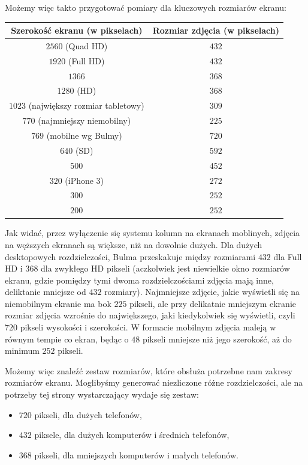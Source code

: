 \documentclass[licencjacka]{pracadypl}
\begin{document}
Możemy więc takto przygotować pomiary dla kluczowych rozmiarów ekranu:

\begin{center}
  \begin{tabular}{|c|c|}
    \hline
    Szerokość ekranu (w pikselach) & Rozmiar zdjęcia (w pikselach) \\
    \hline
    $2560$ (Quad HD) & $432$ \\
    $1920$ (Full HD) & $432$ \\
    $1366$ & $368$ \\
    $1280$ (HD) & $368$ \\
    $1023$ (największy rozmiar tabletowy) & $309$ \\
    $770$ (najmniejszy niemobilny) & $225$ \\
    $769$ (mobilne wg Bulmy) & $720$ \\
    $640$ (SD) & $592$ \\
    $500$ & $452$ \\
    $320$ (iPhone 3) & $272$ \\
    $300$ & $252$ \\
    $200$ & $252$ \\
    \hline
  \end{tabular}
\end{center}

Jak widać, przez wyłączenie się systemu kolumn na ekranach moblinych, zdjęcia na węższych ekranach są większe, niż na dowolnie dużych. Dla dużych desktopowych rozdzielczości, Bulma przeskakuje między rozmiarami $432$ dla Full HD i $368$ dla zwykłego HD pikseli (aczkolwiek jest niewielkie okno rozmiarów ekranu, gdzie pomiędzy tymi dwoma rozdzielczościami zdjęcia mają inne, deliktanie mniejsze od $432$ rozmiary). Najmniejsze zdjęcie, jakie wyświetli się na niemobilnym ekranie ma bok $225$ pikseli, ale przy delikatnie mniejszym ekranie rozmiar zdjęcia wzrośnie do największego, jaki kiedykolwiek się wyświetli, czyli $720$ pikseli wysokości i szerokości. W formacie mobilnym zdjęcia maleją w równym tempie co ekran, będąc o $48$ pikseli mniejsze niż jego szerokość, aż do minimum $252$ pikseli.

Możemy więc znaleźć zestaw rozmiarów, które obsłuża potrzebne nam zakresy rozmiarów ekranu. Moglibyśmy generować niezliczone różne rozdzielczości, ale na potrzeby tej strony wystarczający wydaje się zestaw:

\begin{itemize}
  \item $720$ pikseli, dla dużych telefonów,
  \item $432$ piksele, dla dużych komputerów i średnich telefonów,
  \item $368$ pikseli, dla mniejszych komputerów i małych telefonów.
\end{itemize}
 
\end{document}
